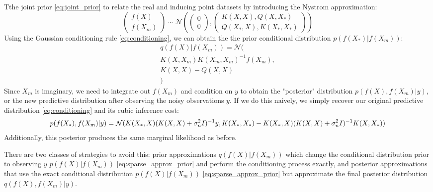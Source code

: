 Tthe joint prior \ref{eq:joint_prior} to relate the real and inducing point datasets by introducing the Nystrom approximation:
\begin{equation*}
    \begin{pmatrix}
        f(X) \\ f(X_m)
    \end{pmatrix} \sim \mathcal{N} \left(
    \begin{pmatrix}
        0 \\ 0
    \end{pmatrix},
    \begin{pmatrix}
        K(X, X), Q(X, X_*) \\ Q(X_*, X), K(X_*, X_*)
    \end{pmatrix}
    \right)
\end{equation*}
Using the Gaussian conditioning rule \ref{eq:conditioning}, we can obtain the the prior conditional distribution $p(f(X_*) | f(X_m))$:
\begin{equation} \label{eq:sparse_exact_prior}
    \begin{aligned}
        q(f(X) | f(X_m)) = \mathcal{N}( \\
            K(X, X_m) K(X_m, X_m)^{-1} f(X_m), \\
            K(X, X) - Q(X, X) \\
        )
    \end{aligned}
\end{equation}
Since $X_m$ is imaginary, we need to integrate out $f(X_m)$ and condition on $y$ to obtain the "posterior" distribution $p(f(X), f(X_m) | y)$, or the new predictive distribution after observing the noisy observations $y$. If we do this naively, we simply recover our original predictive distribution \ref{eq:conditioning} and its cubic inference cost:
\begin{equation*}
    p(f(X_*), f(X_m) | y) = \mathcal{N}( \\
        K(X_*, X) (K(X, X) + \sigma_n^2 I)^{-1} y, \\
        K(X_*, X_*) - K(X_*, X) (K(X, X) + \sigma_n^2 I)^{-1} K(X, X_*)
    )
\end{equation*}
Additionally, this posterior produces the same marginal likelihood \label{eq:marginal_likelihood} as before.

There are two classes of strategies to avoid this: prior approximations $q(f(X) | f(X_m))$ which change the conditional distribution prior to observing $y$ $p(f(X) | f(X_m))$ \ref{eq:sparse_approx_prior} and perform the conditioning process exactly, and posterior approximations that use the exact conditional distribution $p(f(X) | f(X_m))$ \ref{eq:sparse_approx_prior} but approximate the final posterior distribution $q(f(X), f(X_m) | y)$. 

